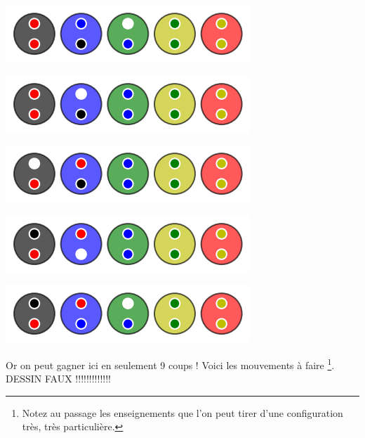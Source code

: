\begin{multicols}{2}
	\columnbreak
	\begin{center}   %
		\includegraphics[scale= 0.45]{content/optimal/wheredowego/algo_bubble/005.png}

		\includegraphics[scale= 0.45]{content/optimal/wheredowego/algo_bubble/006.png}

		\includegraphics[scale= 0.45]{content/optimal/wheredowego/algo_bubble/007.png}

		\includegraphics[scale= 0.45]{content/optimal/wheredowego/algo_bubble/008.png}

		\includegraphics[scale= 0.45]{content/optimal/wheredowego/algo_bubble/009.png}
	\end{center}
\end{multicols}


\medskip

Or on peut gagner ici en seulement 9 coups ! Voici les mouvements à faire
\footnote{
	Notez au passage les enseignements que l'on peut tirer d'une configuration très, très particulière.
}.   DESSIN FAUX !!!!!!!!!!!!!

